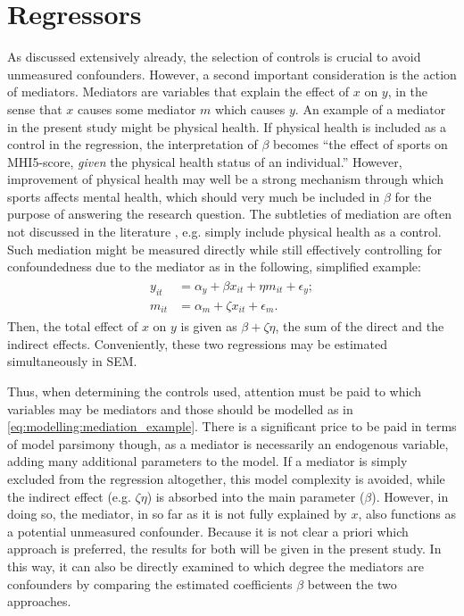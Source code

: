\section{Regressors}
\label{sec:modelling:regressors}
As discussed extensively already, the selection of controls is crucial to avoid unmeasured confounders. However,
a second important consideration is the action of mediators. Mediators are variables that explain the effect
of $x$ on $y$, in the sense that $x$ causes some mediator $m$ which causes $y$. An example of a mediator in the present
study might be physical health. If physical health is included as a control in the regression, the interpretation of $\beta$
becomes ``the effect of sports on MHI5-score, \textit{given} the physical health status of an individual.'' However,
improvement of physical health may well be a strong mechanism through which sports affects mental health, which
should very much be included in $\beta$ for the purpose of answering the research question. The subtleties of mediation
are often not discussed in the literature \cite{imbens2024causal}, e.g.  simply include physical health as a control.
Such mediation might be measured directly while still effectively controlling for confoundedness due to the mediator as
in the following, simplified example:
\begin{align}
\begin{split}
    \label{eq:modelling:mediation_example}
    y_{it} &= \alpha_y + \beta x_{it} + \eta m_{it} + \epsilon_y; \\
    m_{it} &= \alpha_m + \zeta x_{it} + \epsilon_m.
\end{split}
\end{align}
Then, the total effect of $x$ on $y$ is given as $\beta + \zeta \eta$, the sum of the direct and the indirect effects.
Conveniently, these two regressions may be estimated simultaneously in SEM.

Thus, when determining the controls used, attention must be paid to which variables may be mediators and those should be
modelled as in \cref{eq:modelling:mediation_example}. There is a significant price to be paid in terms of model parsimony
though, as a mediator is necessarily an endogenous variable, adding many additional parameters to the model.
If a mediator is simply excluded from the regression altogether, this model complexity is avoided, while the indirect
effect (e.g. $\zeta \eta$) is absorbed into the main parameter ($\beta$). However, in doing so, the mediator, in so far
as it is not fully explained by $x$, also functions as a potential unmeasured confounder.
Because it is not clear a priori which approach is preferred, the results for both will be given in the present study.
In this way, it can also be directly examined to which degree the mediators are confounders by comparing
the estimated coefficients $\beta$ between the two approaches.

